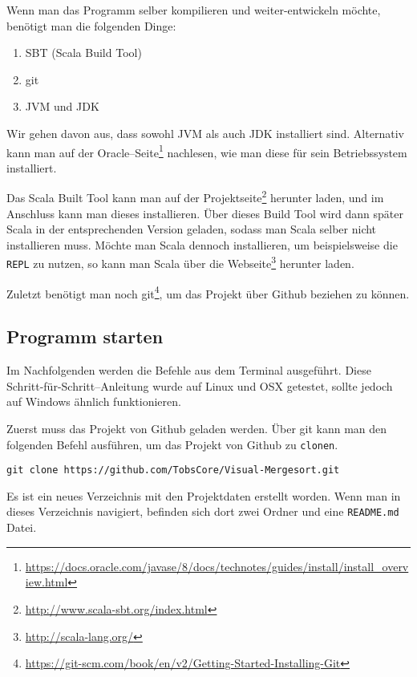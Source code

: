 Wenn man das Programm selber kompilieren und weiter-entwickeln möchte, benötigt man die folgenden Dinge:

\begin{enumerate}
\item SBT (Scala Build Tool)
\item git
\item JVM und JDK
\end{enumerate}

Wir gehen davon aus, dass sowohl JVM als auch JDK installiert sind. Alternativ kann man auf der Oracle--Seite\footnote{ \url{https://docs.oracle.com/javase/8/docs/technotes/guides/install/install_overview.html}} nachlesen, wie man diese für sein Betriebssystem installiert.

Das Scala Built Tool kann man auf der Projektseite\footnote{\url{http://www.scala-sbt.org/index.html}} herunter laden, und im Anschluss kann man dieses installieren. Über dieses Build Tool wird dann später Scala in der entsprechenden Version geladen, sodass man Scala selber nicht installieren muss. Möchte man Scala dennoch installieren, um beispielsweise die \texttt{REPL} \cite{GettingStartedWithTheScalaREPL} zu nutzen, so kann man Scala über die Webseite\footnote{\url{http://scala-lang.org/}} herunter laden.

Zuletzt benötigt man noch git\footnote{\url{https://git-scm.com/book/en/v2/Getting-Started-Installing-Git}}, um das Projekt über Github beziehen zu können.

\subsection{Programm starten}

Im Nachfolgenden werden die Befehle aus dem Terminal ausgeführt. Diese Schritt-für-Schritt--Anleitung wurde auf Linux und OSX getestet, sollte jedoch auf Windows ähnlich funktionieren.

Zuerst muss das Projekt von Github geladen werden. Über git kann man den folgenden Befehl ausführen, um das Projekt von Github zu \texttt{clonen}.

\begin{verbatim}
git clone https://github.com/TobsCore/Visual-Mergesort.git
\end{verbatim}

Es ist ein neues Verzeichnis mit den Projektdaten erstellt worden. Wenn man in dieses Verzeichnis navigiert, befinden sich dort zwei Ordner und eine \texttt{README.md} Datei.

